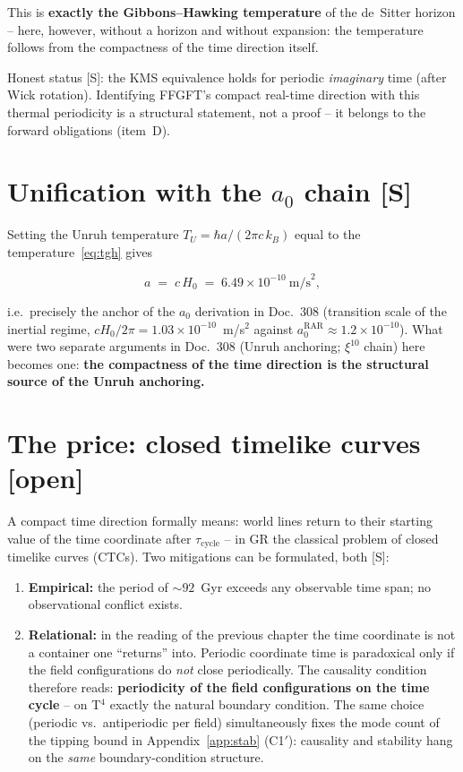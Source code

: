 \documentclass[11pt]{report}
\begin{document}
This is \textbf{exactly the Gibbons--Hawking temperature} of the
de~Sitter horizon -- here, however, without a horizon and without
expansion: the temperature follows from the compactness of the time
direction itself.

Honest status [S]: the KMS equivalence holds for periodic
\emph{imaginary} time (after Wick rotation). Identifying FFGFT's
compact real-time direction with this thermal periodicity is a
structural statement, not a proof -- it belongs to the forward
obligations (item~D).

\section{Unification with the $a_0$ chain [S]}

Setting the Unruh temperature $T_U = \hbar a/(2\pi c\,k_B)$ equal
to the temperature~\eqref{eq:tgh} gives

\begin{equation}
  a \;=\; c\,H_0 \;=\; 6.49\times10^{-10}~\text{m/s}^2,
\end{equation}

i.e.\ precisely the anchor of the $a_0$ derivation in Doc.~308
(transition scale of the inertial regime, $cH_0/2\pi
= 1.03\times10^{-10}$~m/s$^2$ against
$a_0^\text{RAR} \approx 1.2\times10^{-10}$). What were two separate
arguments in Doc.~308 (Unruh anchoring; $\xi^{10}$ chain) here
becomes one: \textbf{the compactness of the time direction is the
structural source of the Unruh anchoring.}

\section{The price: closed timelike curves [open]}

A compact time direction formally means: world lines return to
their starting value of the time coordinate after
$\tau_\text{cycle}$ -- in GR the classical problem of closed
timelike curves (CTCs). Two mitigations can be formulated, both
[S]:

\begin{enumerate}
  \item \textbf{Empirical:} the period of $\sim 92$~Gyr exceeds any
        observable time span; no observational conflict exists.
  \item \textbf{Relational:} in the reading of the previous
        chapter the time coordinate is not a container one
        \enquote{returns} into. Periodic coordinate time is
        paradoxical only if the field configurations do \emph{not}
        close periodically. The causality condition therefore
        reads: \textbf{periodicity of the field configurations on
        the time cycle} -- on T$^4$ exactly the natural boundary
        condition. The same choice (periodic vs.\ antiperiodic per
        field) simultaneously fixes the mode count of the tipping
        bound in Appendix~\ref{app:stab} (C1$'$): causality and stability
        hang on the \emph{same} boundary-condition structure.
\end{enumerate}
\end{document}
